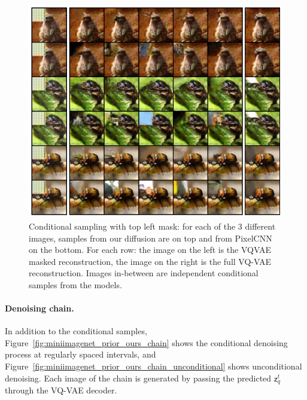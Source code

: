 \documentclass[nohyperref]{article}
\theoremstyle{plain}
\theoremstyle{definition}
\theoremstyle{remark}
\newcommand{\latentdis}{\mathsf{z}_q}
\begin{document}
\begin{figure}
    \centering
    \includegraphics[width=\linewidth]{images/ours/cond_samples_topleft.png}

    \caption{Conditional sampling with top left mask: for each of the 3 different images, samples from our diffusion are on top and from PixelCNN on the bottom. For each row: the image on the left is the VQVAE masked reconstruction, the image on the right is the full VQ-VAE reconstruction. Images in-between are independent conditional samples from the models.}
    \label{fig:miniimagenet_prior_ours_conditional:topleft}
\end{figure}


\paragraph{Denoising chain. }
In addition to the conditional samples, Figure~\ref{fig:miniimagenet_prior_ours_chain} shows the conditional denoising process at regularly spaced intervals, and Figure~\ref{fig:miniimagenet_prior_ours_chain_unconditional} shows unconditional denoising. Each image of the chain is generated by passing the predicted $\latentdis^t$ through the VQ-VAE decoder.
\end{document}
